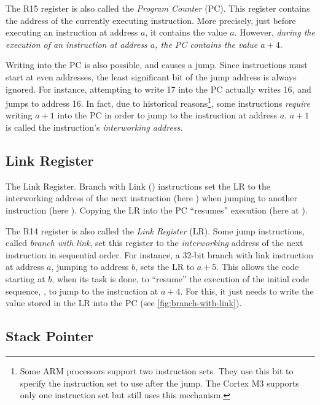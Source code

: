 The R15 register is also called the {\em Program Counter} (PC). This register
contains the address of the currently executing instruction. More precisely,
just before executing an instruction at address $a$, it contains the value $a$.
However, {\em during the execution of an instruction at address $a$, the PC
contains the value $a+4$}.

Writing into the PC is also possible, and causes a jump. Since instructions
must start at even addresses, the least significant bit of the jump address is
always ignored. For instance, attempting to write 17 into the PC actually
writes 16, and jumps to address 16. In fact, due to historical
reasons\footnote{Some ARM processors support two instruction sets. They use
this bit to specify the instruction set to use after the jump. The Cortex M3
supports only one instruction set but still uses this mechanism.}, some
instructions {\em require} writing $a+1$ into the PC in order to jump to the
instruction at address $a$. $a+1$ is called the instruction's {\em interworking
address}.

\subsection{Link Register}

\begin{Figure}
  

  \caption{The Link Register. Branch with Link () instructions set the
  LR to the interworking address of the next instruction (here ) when
  jumping to another instruction (here ). Copying the LR into the PC
  ``resumes'' execution (here at ).}\label{fig:branch-with-link}
\end{Figure}

The R14 register is also called the {\em Link Register} (LR). Some jump
instructions, called {\em branch with link}, set this register to the {\em
interworking} address of the next instruction in sequential order. For
instance, a 32-bit branch with link instruction at address $a$, jumping to
address $b$, sets the LR to $a+5$. This allows the code starting at $b$, when
its task is done, to ``resume'' the execution of the initial code sequence,
\ie, to jump to the instruction at $a+4$. For this, it just needs to write the
value stored in the LR into the PC (see \cref{fig:branch-with-link}).

\subsection{Stack Pointer}\label{subsection:stack-pointer}

